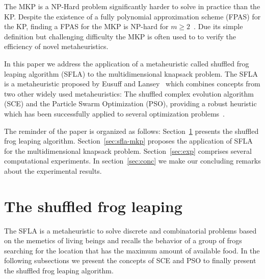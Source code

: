 \documentclass[10pt, conference, compsocconf]{IEEEtran}
\begin{document}
The MKP is a NP-Hard problem significantly harder to solve in practice than the KP.
Despite the existence of a fully polynomial approximation scheme (FPAS) for the KP,
finding a FPAS for the MKP is NP-hard for $m \geqslant 2$~\cite{magazine1984note}.
Due its simple definition but challenging difficulty the MKP is often used to
to verify the efficiency of novel metaheuristics.


In this paper we address the application of a metaheuristic called shuffled
frog leaping algorithm (SFLA) to the multidimensional knapsack problem.
The SFLA is a metaheuristic proposed by Eusuff and Lansey~\cite{eusuff2003optimization, eusuff2006shuffled}
which combines concepts from two other widely used metaheuristics:
The shuffled complex evolution algorithm (SCE) and the 
Particle Swarm Optimization (PSO), providing a robust heuristic which has been
successfully applied to several optimization problems~\cite{bhattacharjee2014shuffled,
horng2014construction, xu2013effective, fang2012effective, luo2014improved}.

The reminder of the paper is organized as follows:
Section~\ref{sec:sfla} presents the shuffled frog leaping algorithm.
Section~\ref{sec:sfla-mkp} proposes the application of SFLA for the multidimensional
knapsack problem.
Section~\ref{sec:exp} comprises several computational experiments.
In section~\ref{sec:conc} we make our concluding remarks about the experimental
results.

\section{The shuffled frog leaping}
\label{sec:sfla}

The SFLA is a metaheuristic to solve discrete and combinatorial problems
based on the memetics of living beings and recalls the behavior of a
group of frogs searching for the location that has the maximum amount of available food.
In the following subsections we present the concepts of SCE and PSO to finally
present the shuffled frog leaping algorithm.
\end{document}
